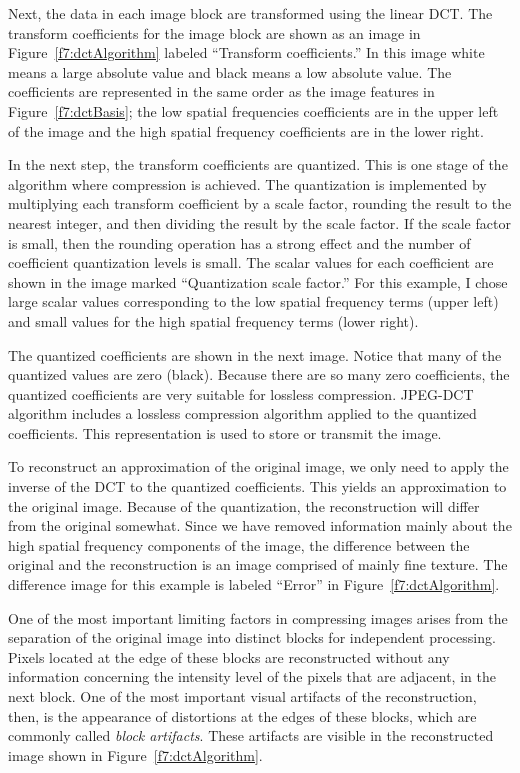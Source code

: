 Next, the data in each image block are transformed using the linear
DCT.  The transform coefficients for the image block are shown as an
image in Figure~\ref{f7:dctAlgorithm} labeled ``Transform
coefficients.''  In this image white means a large absolute value and
black means a low absolute value.  The coefficients are represented in
the same order as the image features in Figure~\ref{f7:dctBasis}; the
low spatial frequencies coefficients are in the upper left of the
image and the high spatial frequency coefficients are in the lower
right.

In the next step, the transform coefficients are quantized.  This is
one stage of the algorithm where compression is achieved.  The
quantization is implemented by multiplying each transform coefficient by a
scale factor, rounding the result to the nearest integer, and then
dividing the result by the scale factor.  If the scale factor is
small, then the rounding operation has a strong effect and the number
of coefficient quantization levels is small.  The scalar
values for each coefficient are shown in the image marked
``Quantization scale factor.''  For this example,
I chose large scalar values corresponding to the low spatial
frequency terms (upper left) and small values for the high
spatial frequency terms (lower right).

The quantized coefficients are shown in the next image.  Notice that
many of the quantized values are zero (black).  Because there are so
many zero coefficients, the quantized coefficients are very suitable
for lossless compression.  JPEG-DCT algorithm includes a lossless
compression algorithm applied to the quantized coefficients.  This
representation is used to store or transmit the image.

To reconstruct an approximation of the original image, we only need
to apply the inverse of the DCT to the quantized coefficients.  This
yields an approximation to the original image.  Because of the
quantization, the reconstruction will differ from the original
somewhat.  Since we have removed information mainly about the high
spatial frequency components of the image, the difference between the
original and the reconstruction is an image comprised of mainly fine
texture.  The difference image for this example is labeled ``Error''
in Figure~\ref{f7:dctAlgorithm}.

One of the most important limiting factors in compressing images
arises from the separation of the original image into distinct blocks
for independent processing.  Pixels located at the edge of these blocks
are reconstructed without any information concerning the intensity level of the
pixels that are adjacent, in the next block.  One of the most important
visual artifacts of the reconstruction, then, is the appearance of
distortions at the edges of these blocks, which are commonly called
{\em block artifacts}.  These artifacts are visible in the reconstructed image
shown in Figure~\ref{f7:dctAlgorithm}.

